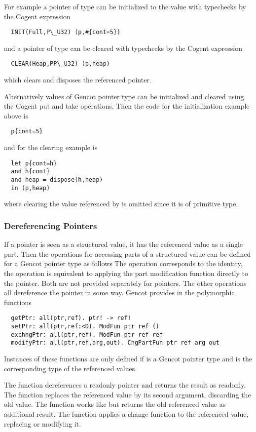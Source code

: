 For example a pointer  of type  can be initialized to the value  with typechecks by the 
Cogent expression
\begin{verbatim}
  INIT(Full,P\_U32) (p,#{cont=5})
\end{verbatim}
and a pointer  of type  can be cleared with typechecks by the Cogent expression
\begin{verbatim}
  CLEAR(Heap,PP\_U32) (p,heap)
\end{verbatim}
which clears and disposes the referenced pointer.

Alternatively values of Gencot pointer type can be initialized and cleared using the Cogent put and take
operations. Then the code for the initialization example above is
\begin{verbatim}
  p{cont=5}
\end{verbatim}
and for the clearing example is
\begin{verbatim}
  let p{cont=h}
  and h{cont}
  and heap = dispose(h,heap)
  in (p,heap)
\end{verbatim}
where clearing the value referenced by  is omitted since it is of primitive type.

\subsubsection{Dereferencing Pointers}

If a pointer is seen as a structured value, it has the referenced value as a single part.
Then the operations for accessing parts of a structured value can be defined for a Gencot pointer type as follows
The operation  corresponds to the identity, the operation  is equivalent to applying the
part modification function directly to the pointer. Both are not provided separately for pointers.
The other operations all dereference the pointer in some way. Gencot provides in  
the polymorphic functions
\begin{verbatim}
  getPtr: all(ptr,ref). ptr! -> ref! 
  setPtr: all(ptr,ref:<D). ModFun ptr ref ()
  exchngPtr: all(ptr,ref). ModFun ptr ref ref
  modifyPtr: all(ptr,ref,arg,out). ChgPartFun ptr ref arg out
\end{verbatim}
Instances of these functions are only defined if  is a Gencot pointer type and  is the corresponding
type of the referenced values. 

The function  dereferences a readonly pointer and returns the result as readonly. The function 
replaces the referenced value by its second argument, discarding the old value. The function  works like 
 but returns the old referenced value as additional result. The function  applies a change
function to the referenced value, replacing or modifying it.

